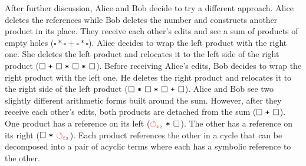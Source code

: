 \documentclass[nonacm, acmsmall, screen, review]{acmart}
\newcommand{\e}{\varepsilon}
\newcommand{\id}[1]{\textcolor{gray}{\ensuremath{#1}}}
\newcommand{\eid}[2]{{#2}^{\id{#1}}}
\newcommand{\hole}{\ensuremath{\square}} %
\newcommand{\ePlus}[3]{#2~\eid{#1}{\texttt{+}}~#3}
\newcommand{\eTimes}[3]{#2~\eid{#1}{\texttt{*}}~#3}
\newcommand{\cycleVertex}[1]{\textcolor{red}{\ensuremath{\circlearrowleft_{#1}}}}
\begin{document}
After further discussion, Alice and Bob decide to try a different approach.
Alice deletes the references while Bob deletes the number and constructs another product in its place.
They receive each other's edits and see a sum of products of empty holes ($\hole * \hole + \hole * \hole$).
Alice decides to wrap the left product with the right one.
She deletes the left product and relocates it to the left side of the right product ($\ePlus{}{\hole}{\eTimes{}{\eTimes{}{\hole}{\hole}}{\hole}}$).
Before receiving Alice's edits,
Bob decides to wrap the right product with the left one.
He deletes the right product and relocates it to the right side of the left product ($\ePlus{}{\eTimes{}{\hole}{\eTimes{}{\hole}{\hole}}}{\hole}$).
Alice and Bob see two slightly different arithmetic forms built around the sum.
However, after they receive each other's edits, both products are detached from the sum ($\ePlus{}{\hole}{\hole}$).
One product has a reference on its left ($\eTimes{}{\cycleVertex{\e_2}}{\hole}$).
The other has a reference on its right ($\eTimes{}{\hole}{\cycleVertex{\e_3}}$).
Each product references the other in a cycle that can be
decomposed into a pair of acyclic terms where each has a symbolic reference to the other.







\end{document}
